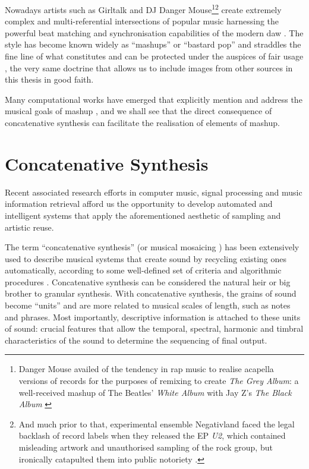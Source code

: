 Nowadays artists such as Girltalk and DJ Danger Mouse\footnote{Danger Mouse availed of the tendency in rap music to realise acapella versions of records for the purposes of remixing to create \textit{The Grey Album}: a well-received mashup of The Beatles' \textit{White Album} with Jay Z's \textit{The Black Album} \citep{Gunderson204}}\footnote{And much prior to that, experimental ensemble Negativland faced the legal backlash of record labels when they released the EP \textit{U2}, which contained misleading artwork and unauthorised sampling of the rock group, but ironically catapulted them into public notoriety \citep{herman1998politics, lysloff2003music}.} create extremely complex and multi-referential intersections of popular music harnessing the powerful beat matching and synchronisation capabilities of the modern \acrshort{daw} \citep{Humphrey2013}. The style has become known widely as ``mashups'' or ``bastard pop'' \citep{McGranahan2010} and straddles the fine line of what constitutes and can be protected under the auspices of fair usage \citep{Mongillo2009}, the very same doctrine that allows us to include images from other sources in this thesis in good faith.

Many computational works have emerged that explicitly mention and address the musical goals of mashup \citep{Tokui2008, Davies2013, Davies2014a, Davies2014b, Lee2015, Smith2015, Meroo-Peuela2017}, and we shall see that the direct consequence of concatenative synthesis can facilitate the realisation of elements of mashup.

\section{Concatenative Synthesis}

Recent associated research efforts in computer music, signal processing and music information retrieval afford us the opportunity to develop automated and intelligent systems that apply the aforementioned aesthetic of sampling and artistic reuse. 

The term ``concatenative synthesis'' (or musical mosaicing \citep{Zils2001}) has been extensively used to describe musical systems that create sound by recycling existing ones automatically, according to some well-defined set of criteria and algorithmic procedures \citep{Schwarz2000}. Concatenative synthesis can be considered the natural heir or big brother to granular synthesis. With concatenative synthesis, the grains of sound become “units” and are more related to musical scales of length, such as notes and phrases. Most importantly, descriptive information is attached to these units of sound: crucial features that allow the temporal, spectral, harmonic and timbral characteristics of the sound to determine the sequencing of final output. 

